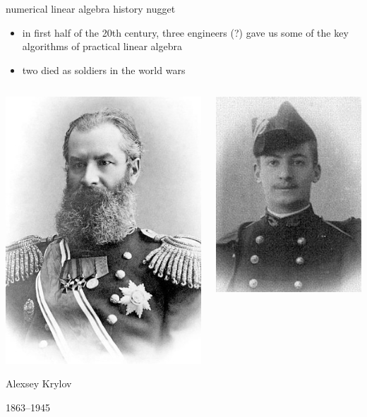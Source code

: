 \documentclass[usepdftitle=false,usenames,dvipsnames]{beamer}
\begin{document}
\begin{frame}{numerical linear algebra history nugget}

\begin{itemize}
\item in first half of the 20th century, three engineers (?) gave us some of the key algorithms of practical linear algebra
\item two died as soldiers in the world wars
\end{itemize}

\bigskip
\begin{columns}
\begin{column}{0.3\textwidth}
\centering
\includegraphics[height=0.5\textheight]{figs/akrylov}

\footnotesize
Alexsey Krylov

1863--1945
\end{column}
\begin{column}{0.3\textwidth}
\centering
\includegraphics[height=0.5\textheight]{figs/acholesky}


\end{column}
\end{columns}
\end{frame}
\end{document}
